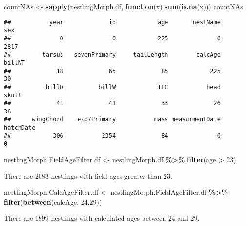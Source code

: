 \documentclass[
]{article}
\newenvironment{Shaded}{\begin{snugshade}}{\end{snugshade}}
\newcommand{\ControlFlowTok}[1]{\textcolor[rgb]{0.13,0.29,0.53}{\textbf{#1}}}
\newcommand{\DecValTok}[1]{\textcolor[rgb]{0.00,0.00,0.81}{#1}}
\newcommand{\FunctionTok}[1]{\textcolor[rgb]{0.13,0.29,0.53}{\textbf{#1}}}
\newcommand{\NormalTok}[1]{#1}
\newcommand{\OtherTok}[1]{\textcolor[rgb]{0.56,0.35,0.01}{#1}}
\newcommand{\SpecialCharTok}[1]{\textcolor[rgb]{0.81,0.36,0.00}{\textbf{#1}}}
\begin{document}
\begin{Shaded}
\begin{Highlighting}[]
\NormalTok{countNAs }\OtherTok{\textless{}{-}} \FunctionTok{sapply}\NormalTok{(nestlingMorph.df, }\ControlFlowTok{function}\NormalTok{(x) }\FunctionTok{sum}\NormalTok{(}\FunctionTok{is.na}\NormalTok{(x)))}
\NormalTok{countNAs}
\end{Highlighting}
\end{Shaded}

\begin{verbatim}
##           year             id            age       nestName            sex 
##              0              0            225              0           2817 
##         tarsus   sevenPrimary     tailLength        calcAge         billNT 
##             18             65             85            225             30 
##          billD          billW            TEC           head          skull 
##             41             41             33             26             36 
##      wingChord    exp7Primary           mass measurmentDate      hatchDate 
##            306           2354             84              0              0
\end{verbatim}

\begin{Shaded}
\begin{Highlighting}[]
\NormalTok{nestlingMorph.FieldAgeFilter.df }\OtherTok{\textless{}{-}}\NormalTok{ nestlingMorph.df }\SpecialCharTok{\%\textgreater{}\%} 
  \FunctionTok{filter}\NormalTok{(age }\SpecialCharTok{\textgreater{}} \DecValTok{23}\NormalTok{)}
\end{Highlighting}
\end{Shaded}

There are 2083 nestlings with field ages greater than 23.

\begin{Shaded}
\begin{Highlighting}[]
\NormalTok{nestlingMorph.CalcAgeFilter.df }\OtherTok{\textless{}{-}}\NormalTok{ nestlingMorph.FieldAgeFilter.df }\SpecialCharTok{\%\textgreater{}\%} 
  \FunctionTok{filter}\NormalTok{(}\FunctionTok{between}\NormalTok{(calcAge, }\DecValTok{24}\NormalTok{,}\DecValTok{29}\NormalTok{))}
\end{Highlighting}
\end{Shaded}

There are 1899 nestlings with calculated ages between 24 and 29.
\end{document}
